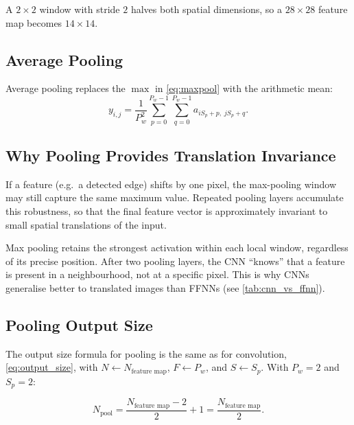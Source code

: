 \documentclass[12pt,a4paper]{article}
\begin{document}
A $2\times2$ window with stride $2$ halves both spatial dimensions, so a
$28\times28$ feature map becomes $14\times14$.

\subsection{Average Pooling}
\label{subsec:avg_pool}

Average pooling replaces the $\max$ in \cref{eq:maxpool} with the arithmetic
mean:
\begin{equation}
  y_{i,j} = \frac{1}{P_w^2}
             \sum_{p=0}^{P_w-1}\sum_{q=0}^{P_w-1}
             a_{iS_p + p,\; jS_p + q}.
  \label{eq:avgpool}
\end{equation}

\subsection{Why Pooling Provides Translation Invariance}
\label{subsec:pool_invariance}

If a feature (e.g.\ a detected edge) shifts by one pixel, the max-pooling
window may still capture the same maximum value.  Repeated pooling layers
accumulate this robustness, so that the final feature vector is approximately
invariant to small spatial translations of the input.

\begin{keyinsight}[title=Key Insight: Translation Invariance]
Max pooling retains the strongest activation within each local window,
regardless of its precise position.  After two pooling layers, the CNN
``knows'' that a feature is present in a neighbourhood, not at a specific
pixel.  This is why CNNs generalise better to translated images than FFNNs
(see \cref{tab:cnn_vs_ffnn}).
\end{keyinsight}

\subsection{Pooling Output Size}
\label{subsec:pool_size}

The output size formula for pooling is the same as for convolution,
\cref{eq:output_size}, with $N \leftarrow N_{\text{feature map}}$,
$F \leftarrow P_w$, and $S \leftarrow S_p$.  With $P_w = 2$ and $S_p = 2$:

\begin{equation}
  N_{\text{pool}} = \frac{N_{\text{feature map}} - 2}{2} + 1
                  = \frac{N_{\text{feature map}}}{2}.
  \label{eq:pool_size}
\end{equation}
\end{document}
